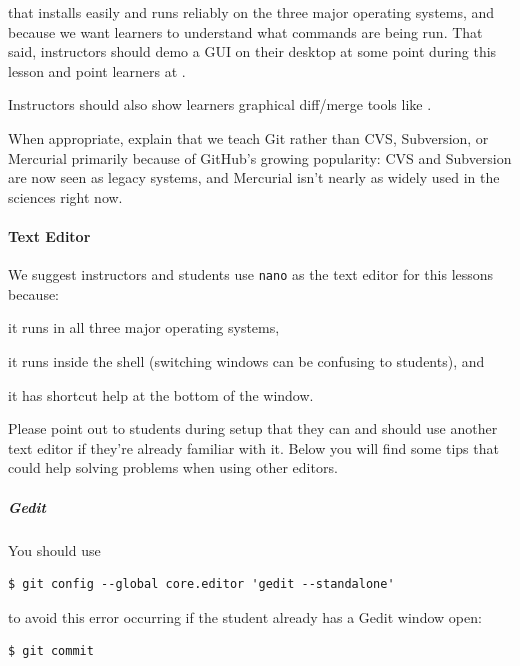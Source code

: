 \documentclass{book}
\begin{document}
\begin{swcitemize}
  that installs easily and runs reliably on the three major operating
  systems, and because we want learners to understand what commands are
  being run. That said, instructors should demo a GUI on their desktop
  at some point during this lesson and point learners at
  .
\item
  Instructors should also show learners graphical diff/merge tools like
  .
\item
  When appropriate, explain that we teach Git rather than CVS,
  Subversion, or Mercurial primarily because of GitHub's growing
  popularity: CVS and Subversion are now seen as legacy systems, and
  Mercurial isn't nearly as widely used in the sciences right now.
\end{swcitemize}

\mbox{}\paragraph{Text Editor}

We suggest instructors and students use \texttt{nano} as the text editor
for this lessons because:

\begin{swcitemize}
\item
  it runs in all three major operating systems,
\item
  it runs inside the shell (switching windows can be confusing to
  students), and
\item
  it has shortcut help at the bottom of the window.
\end{swcitemize}

Please point out to students during setup that they can and should use
another text editor if they're already familiar with it. Below you will
find some tips that could help solving problems when using other
editors.

\subparagraph{Gedit}

You should use

\begin{verbatim}
$ git config --global core.editor 'gedit --standalone'
\end{verbatim}

to avoid this error occurring if the student already has a Gedit window
open:

\begin{verbatim}
$ git commit
\end{verbatim}
\end{document}
